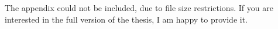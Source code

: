 \documentclass[a4paper,man,floatsintext,natbib,donotrepeattitle]{apa6}
\begin{document}
The appendix could not be included, due to file size restrictions. If you are interested in the full version of the thesis, I am happy to provide it.
\vfill
\pagebreak

\end{document}
